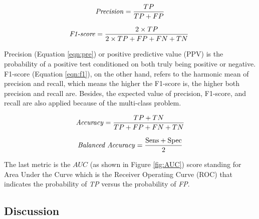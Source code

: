 \documentclass[sensors,article,accept,pdftex,moreauthors]{Definitions/mdpi}
\begin{document}
	\begin{equation}
		\label{eqn:pre}
		\text{\textit{Precision}} = \frac{TP}{TP + FP}
	\end{equation}
	
	\begin{equation}
		\label{eqn:f1}
		\text{\textit{F1-score}} = \frac{2 \times TP}{2 \times TP + FP + FN + TN}\
	\end{equation}
	
	{Precision} %
 (Equation \eqref{eqn:pre}) or positive predictive value (PPV) is the probability of a positive test conditioned on both truly being positive or negative. F1-score (Equation \eqref{eqn:f1}), on the other hand, refers to the harmonic mean of precision and recall, which means the higher the F1-score is, the higher both precision and recall are. Besides, the expected value of precision, F1-score, and recall are also applied because of the multi-class problem.
	
	\begin{equation}
		\label{eqn:acc}
		\text{\textit{Accuracy}} = \frac{TP + TN}{TP + FP + FN + TN}
	\end{equation}
	
	\begin{equation}
		\label{eqn:balacc}
		\text{\textit{Balanced Accuracy}} = \frac{\text{Sens} + \text{Spec}}{2}
	\end{equation}
	
	{The last} %
 metric is the $AUC$ {(as shown in Figure \mbox{\ref{fig:AUC}})} score standing for Area Under the Curve which is the Receiver Operating Curve (ROC) that indicates the probability of \textit{TP} versus the probability of \textit{FP}.  
	
	\subsection{Discussion} 

	
\end{document}
